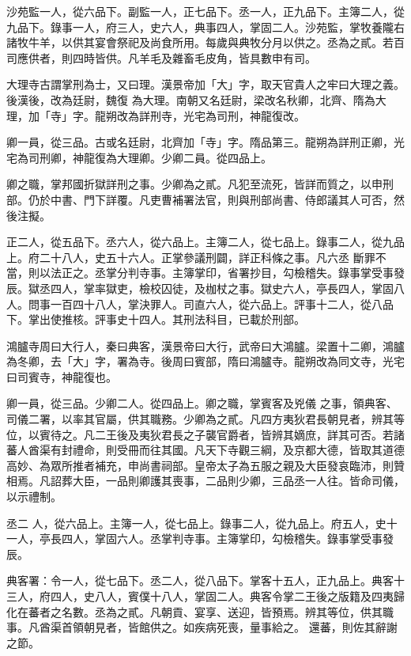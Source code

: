 \begin{pinyinscope}
 沙苑監一人，從六品下。副監一人，正七品下。丞一人，正九品下。主簿二人，從九品下。錄事一人，府三人，史六人，典事四人，掌固二人。沙苑監，掌牧養隴右諸牧牛羊，以供其宴會祭祀及尚食所用。每歲與典牧分月以供之。丞為之貳。若百司應供者，則四時皆供。凡羊毛及雜畜毛皮角，皆具數申有司。



 大理寺古謂掌刑為士，又曰理。漢景帝加「大」字，取天官貴人之牢曰大理之義。後漢後，改為廷尉，魏復
 為大理。南朝又名廷尉，梁改名秋卿，北齊、隋為大理，加「寺」字。龍朔改為詳刑寺，光宅為司刑，神龍復改。



 卿一員，從三品。古或名廷尉，北齊加「寺」字。隋品第三。龍朔為詳刑正卿，光宅為司刑卿，神龍復為大理卿。少卿二員。從四品上。



 卿之職，掌邦國折獄詳刑之事。少卿為之貳。凡犯至流死，皆詳而質之，以申刑部。仍於中書、門下詳覆。凡吏曹補署法官，則與刑部尚書、侍郎議其人可否，然後注擬。



 正二人，從五品下。丞六人，從六品上。主簿二人，從七品上。錄事二人，從九品上。府二十八人，史五十六人。正掌參議刑闢，詳正科條之事。凡六丞
 斷罪不當，則以法正之。丞掌分判寺事。主簿掌印，省署抄目，勾檢稽失。錄事掌受事發辰。獄丞四人，掌率獄吏，檢校囚徒，及枷杖之事。獄史六人，亭長四人，掌固八人。問事一百四十八人，掌決罪人。司直六人，從六品上。評事十二人，從八品下。掌出使推核。評事史十四人。其刑法科目，已載於刑部。



 鴻臚寺周曰大行人，秦曰典客，漢景帝曰大行，武帝曰大鴻臚。梁置十二卿，鴻臚為冬卿，去「大」字，署為寺。後周曰賓部，隋曰鴻臚寺。龍朔改為同文寺，光宅曰司賓寺，神龍復也。



 卿一員，從三品。少卿二人。從四品上。卿之職，掌賓客及兇儀
 之事，領典客、司儀二署，以率其官屬，供其職務。少卿為之貳。凡四方夷狄君長朝見者，辨其等位，以賓待之。凡二王後及夷狄君長之子襲官爵者，皆辨其嫡庶，詳其可否。若諸蕃人酋渠有封禮命，則受冊而往其國。凡天下寺觀三綱，及京都大德，皆取其道德高妙、為眾所推者補充，申尚書祠部。皇帝太子為五服之親及大臣發哀臨沛，則贊相焉。凡詔葬大臣，一品則卿護其喪事，二品則少卿，三品丞一人往。皆命司儀，以示禮制。



 丞二
 人，從六品上。主簿一人，從七品上。錄事二人，從九品上。府五人，史十一人，亭長四人，掌固六人。丞掌判寺事。主簿掌印，勾檢稽失。錄事掌受事發辰。



 典客署：令一人，從七品下。丞二人，從八品下。掌客十五人，正九品上。典客十三人，府四人，史八人，賓僕十八人，掌固二人。典客令掌二王後之版籍及四夷歸化在蕃者之名數。丞為之貳。凡朝貢、宴享、送迎，皆預焉。辨其等位，供其職事。凡酋渠首領朝見者，皆館供之。如疾病死喪，量事給之。
 還蕃，則佐其辭謝之節。




\end{pinyinscope}

